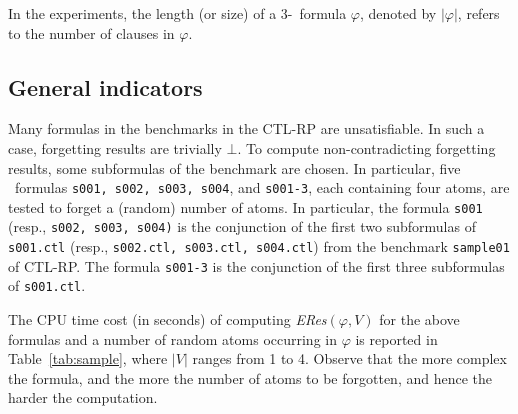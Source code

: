 \documentclass[twoside,11pt]{article}
\begin{document}
	In the experiments, the length (or size) of a 3-\CNF\ formula $\varphi$, denoted by $|\varphi|$, refers to the  number of clauses in $\varphi$.
	
	\subsection{General indicators}
	Many formulas in the benchmarks in the CTL-RP are unsatisfiable. In such a case, forgetting results are trivially $\bot$. To compute non-contradicting forgetting results, some subformulas of the benchmark are chosen. In particular, five \CTL\ formulas \texttt{s001, s002, s003, s004}, and \texttt{s001-3}, each   containing four atoms, are tested to forget a (random) number of atoms.  In particular, the formula \texttt{s001} (resp.,  \texttt{s002, s003, s004)} is the conjunction of the first two subformulas of \texttt{s001.ctl} (resp.,  \texttt{s002.ctl, s003.ctl, s004.ctl}) from the benchmark \texttt{sample01} of CTL-RP.
	The formula \texttt{s001-3} is the conjunction of the first three subformulas of \texttt{s001.ctl}. %
	
	
	The CPU time cost (in seconds) of computing \emph{ ERes}$(\varphi,V)$ for the above formulas and a number of random atoms occurring in $\varphi$ is reported in Table~\ref{tab:sample}, where $|V|$ ranges from 1 to 4.
	Observe that the more complex the formula, and the more the number of atoms to be forgotten, and hence  the harder the computation.
	
	
	\begin{table}%
		\centering
		\caption{CPU time (in seconds) of computing \emph {ERes}$(\varphi,V)$.}\label{tab:sample}
	\end{table}
	
\end{document}

